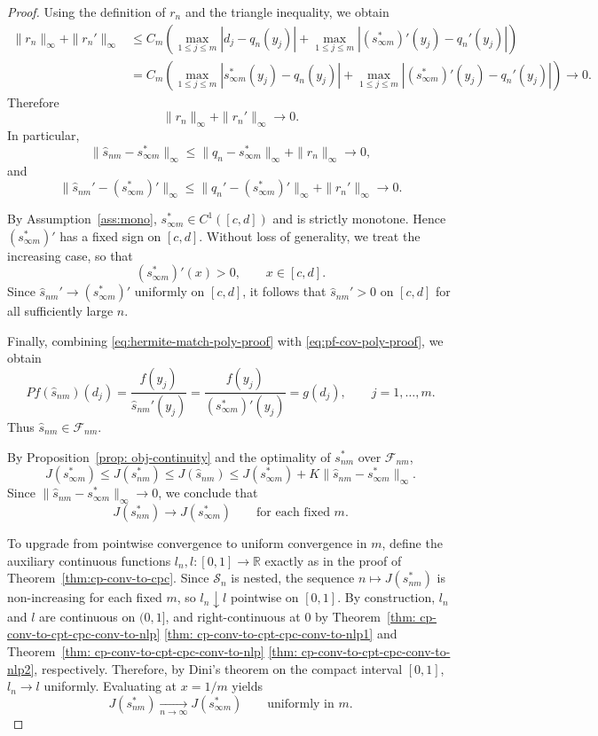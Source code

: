\documentclass[12pt,leqno]{amsart}
\begin{document}
\begin{proof}
Using the definition of $r_n$ and the triangle inequality, we obtain
\begin{align*}
\|r_n\|_\infty+\|r_n'\|_\infty
&\le
C_m\left(
\max_{1\le j\le m}|d_j-q_n(y_j)|
+
\max_{1\le j\le m}|(s_{\infty m}^*)'(y_j)-q_n'(y_j)|
\right)\\
&=
C_m\left(
\max_{1\le j\le m}|s_{\infty m}^*(y_j)-q_n(y_j)|
+
\max_{1\le j\le m}|(s_{\infty m}^*)'(y_j)-q_n'(y_j)|
\right)\to 0.
\end{align*}
Therefore
\[
\|r_n\|_\infty+\|r_n'\|_\infty\to 0.
\]
In particular,
\[
\|\hat s_{nm}-s_{\infty m}^*\|_\infty
\le
\|q_n-s_{\infty m}^*\|_\infty+\|r_n\|_\infty\to 0,
\]
and
\[
\|\hat s_{nm}'-(s_{\infty m}^*)'\|_\infty
\le
\|q_n'-(s_{\infty m}^*)'\|_\infty+\|r_n'\|_\infty\to 0.
\]

By Assumption~\ref{ass:mono}, $s_{\infty m}^*\in C^1([c,d])$ and is
strictly monotone. Hence $(s_{\infty m}^*)'$ has a fixed sign on
$[c,d]$. Without loss of generality, we treat the increasing case, so
that
\[
(s_{\infty m}^*)'(x)>0,\qquad x\in[c,d].
\]
Since $\hat s_{nm}'\to (s_{\infty m}^*)'$ uniformly on $[c,d]$, it
follows that $\hat s_{nm}'>0$ on $[c,d]$ for all sufficiently large
$n$.

Finally, combining \eqref{eq:hermite-match-poly-proof} with
\eqref{eq:pf-cov-poly-proof}, we obtain
\[
Pf(\hat s_{nm})(d_j)
=
\frac{f(y_j)}{\hat s_{nm}'(y_j)}
=
\frac{f(y_j)}{(s_{\infty m}^*)'(y_j)}
=
g(d_j),
\qquad j=1,\dots,m.
\]
Thus $\hat s_{nm}\in\mathcal F_{nm}$.

By Proposition~\ref{prop: obj-continuity} and the optimality of
$s_{nm}^*$ over $\mathcal F_{nm}$,
\[
J(s_{\infty m}^*)
\le
J(s_{nm}^*)
\le
J(\hat s_{nm})
\le
J(s_{\infty m}^*)+K\|\hat s_{nm}-s_{\infty m}^*\|_\infty.
\]
Since $\|\hat s_{nm}-s_{\infty m}^*\|_\infty\to 0$, we conclude that
\[
J(s_{nm}^*)\to J(s_{\infty m}^*)
\qquad\text{for each fixed }m.
\]

To upgrade from pointwise convergence to uniform convergence in $m$,
define the auxiliary continuous functions $l_n,l:[0,1]\to\mathbb R$
exactly as in the proof of Theorem~\ref{thm:cp-conv-to-cpc}. Since
$\mathcal S_n$ is nested, the sequence $n\mapsto J(s_{nm}^*)$ is
non-increasing for each fixed $m$, so $l_n\downarrow l$ pointwise on
$[0,1]$. By construction, $l_n$ and $l$ are continuous on $(0,1]$,
and right-continuous at $0$ by
Theorem~\ref{thm: cp-conv-to-cpt-cpc-conv-to-nlp}%
\ref{thm: cp-conv-to-cpt-cpc-conv-to-nlp1} and
Theorem~\ref{thm: cp-conv-to-cpt-cpc-conv-to-nlp}%
\ref{thm: cp-conv-to-cpt-cpc-conv-to-nlp2}, respectively.
Therefore, by Dini's theorem on the compact interval $[0,1]$,
$l_n\to l$ uniformly. Evaluating at $x=1/m$ yields
\[
J(s_{nm}^*)\xrightarrow[n\to\infty]{}J(s_{\infty m}^*)
\qquad\text{uniformly in }m.
\]
\end{proof}
\end{document}
